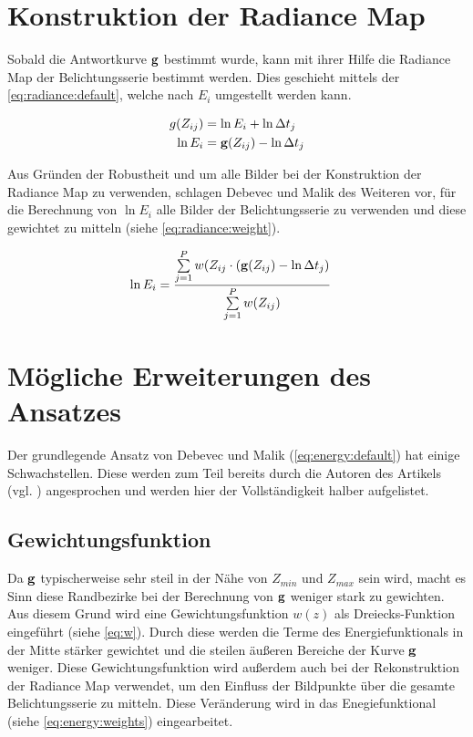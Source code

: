 \section{Konstruktion der Radiance Map}
\label{sec:algo:radiance}
Sobald die Antwortkurve $\mathbf g$ bestimmt wurde, kann mit ihrer Hilfe die \gls{Radiance Map} der Belichtungsserie bestimmt werden. Dies geschieht mittels der \autoref{eq:radiance:default}, welche nach $E_i$ umgestellt werden kann. 

\begin{align}
\label{eq:radiance:default}
g(Z_{ij}) &= \ln E_i + \ln \Delta t_j\\
\ln E_i &= \mathbf g(Z_{ij})-\ln \Delta t_j
\end{align}

Aus Gründen der Robustheit und um alle Bilder bei der Konstruktion der \gls{Radiance Map} zu verwenden, schlagen Debevec und Malik des Weiteren vor, für die Berechnung von $\ln E_i$ alle Bilder der Belichtungsserie zu verwenden und diese gewichtet zu mitteln (siehe \autoref{eq:radiance:weight}).


\begin{align}
\label{eq:radiance:weight}
\ln E_i &= \frac{\sum \limits_{j=1}^P w(Z_{ij} \cdot (\mathbf g(Z_{ij})-\ln \Delta t_j)}{\sum \limits_{j=1}^P w(Z_{ij})}
\end{align}

\section{Mögliche Erweiterungen des Ansatzes}
\label{algo:schwachstellen}
Der grundlegende Ansatz von Debevec und Malik (\autoref{eq:energy:default}) hat einige Schwachstellen. Diese werden zum Teil bereits durch die Autoren des Artikels (vgl. \cite{paper}) angesprochen und werden hier der Vollständigkeit halber aufgelistet.

\subsection{Gewichtungsfunktion}
\label{algo:schwachstellen:gewichtung}
Da $\mathbf g$ typischerweise sehr steil in der Nähe von $Z_{min}$ und $Z_{max}$ sein wird, macht es Sinn diese Randbezirke bei der Berechnung von $\mathbf g$ weniger stark zu gewichten. Aus diesem Grund wird eine Gewichtungsfunktion $w(z)$ als Dreiecks-Funktion eingeführt (siehe \autoref{eq:w}). 
Durch diese werden die Terme des Energiefunktionals in der Mitte stärker gewichtet und die steilen äußeren Bereiche der Kurve $\mathbf g$ weniger. Diese Gewichtungsfunktion wird außerdem auch bei der Rekonstruktion der \gls{Radiance Map} verwendet, um den Einfluss der Bildpunkte über die gesamte Belichtungsserie zu mitteln. Diese Veränderung wird in das Enegiefunktional (siehe \autoref{eq:energy:weights}) eingearbeitet.

